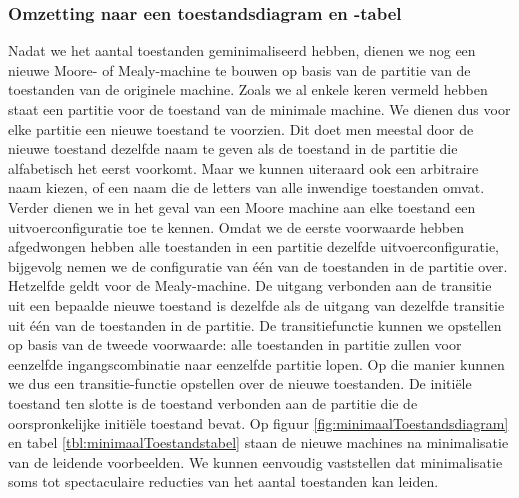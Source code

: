 \subsubsection{Omzetting naar een toestandsdiagram en -tabel}
Nadat we het aantal toestanden geminimaliseerd hebben, dienen we nog een nieuwe Moore- of Mealy-machine te bouwen op basis van de partitie van de toestanden van de originele machine. Zoals we al enkele keren vermeld hebben staat een partitie voor de toestand van de minimale machine. We dienen dus voor elke partitie een nieuwe toestand te voorzien. Dit doet men meestal door de nieuwe toestand dezelfde naam te geven als de toestand in de partitie die alfabetisch het eerst voorkomt. Maar we kunnen uiteraard ook een arbitraire naam kiezen, of een naam die de letters van alle inwendige toestanden omvat. Verder dienen we in het geval van een Moore machine aan elke toestand een uitvoerconfiguratie toe te kennen. Omdat we de eerste voorwaarde hebben afgedwongen hebben alle toestanden in een partitie dezelfde uitvoerconfiguratie, bijgevolg nemen we de configuratie van \'e\'en van de toestanden in de partitie over. Hetzelfde geldt voor de Mealy-machine. De uitgang verbonden aan de transitie uit een bepaalde nieuwe toestand is dezelfde als de uitgang van dezelfde transitie uit \'e\'en van de toestanden in de partitie. De transitiefunctie kunnen we opstellen op basis van de tweede voorwaarde: alle toestanden in partitie zullen voor eenzelfde ingangscombinatie naar eenzelfde partitie lopen. Op die manier kunnen we dus een transitie-functie opstellen over de nieuwe toestanden. De initi\"ele toestand ten slotte is de toestand verbonden aan de partitie die de oorspronkelijke initi\"ele toestand bevat. Op figuur \ref{fig:minimaalToestandsdiagram} en tabel \ref{tbl:minimaalToestandstabel} staan de nieuwe machines na minimalisatie van de leidende voorbeelden. We kunnen eenvoudig vaststellen dat minimalisatie soms tot spectaculaire reducties van het aantal toestanden kan leiden.
